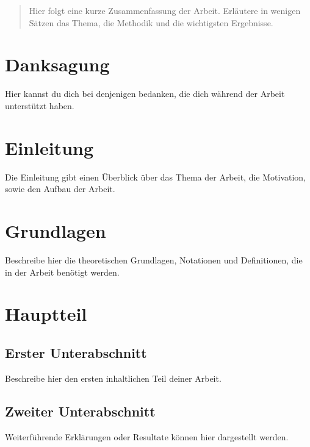 \documentclass[12pt]{report}
\begin{document}







\begin{abstract}
    Hier folgt eine kurze Zusammenfassung der Arbeit. Erläutere in wenigen Sätzen das Thema, die Methodik und die wichtigsten Ergebnisse.
\end{abstract}
\thispagestyle{empty}
\newpage

\section*{Danksagung}
Hier kannst du dich bei denjenigen bedanken, die dich während der Arbeit unterstützt haben. 
\thispagestyle{empty}
\newpage

\tableofcontents
\thispagestyle{empty}
\newpage

\listoffigures
\thispagestyle{empty}
\newpage

\listoftables
\thispagestyle{empty}
\newpage

\section{Einleitung}
Die Einleitung gibt einen Überblick über das Thema der Arbeit, die Motivation, sowie den Aufbau der Arbeit.

\section{Grundlagen}
Beschreibe hier die theoretischen Grundlagen, Notationen und Definitionen, die in der Arbeit benötigt werden.

\section{Hauptteil}
\subsection{Erster Unterabschnitt}
Beschreibe hier den ersten inhaltlichen Teil deiner Arbeit.

\subsection{Zweiter Unterabschnitt}
Weiterführende Erklärungen oder Resultate können hier dargestellt werden.
\end{document}
